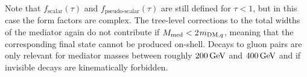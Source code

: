 Note that $ f_{\text{scalar}} (\tau)$ and $ f_{\text{pseudo-scalar}} (\tau)$ are still defined for $\tau < 1$, but in this case the form factors are complex. The tree-level corrections to the total widths of the mediator again do not contribute if $M_{\rm{med}} < 2 \hspace{0.25mm}  m_{{\rm{DM}}, q}$, meaning that the corresponding final state cannot be produced on-shell.  Decays to gluon pairs are only relevant for mediator masses between roughly $200 \, {\rm GeV}$ and $400 \,{\rm GeV}$ and if invisible decays are kinematically forbidden.
	
\begin{comment}


Comparing or combining searches for dark matter (or any collider physics result) requires that we assume a model, whether we are comparing searches in one channel to searches in other channels, at other collision energies, or at other collider experiments. This document adopts the model choices made for early Run-2 LHC searches by the ATLAS/CMS Dark Matter Forum (REF), summarized below. These models assume that the DM particle is a Dirac fermion~$\chi$ and that the particle mediating the interaction (the `mediator') is exchanged in the $s$-channel. Each model is characterised by four parameters: the dark matter matter mass,~$\mDM$, the mediator mass,~$\mmed$, the mediator coupling to quarks,~$\gq$, and the mediator coupling to DM,~$\gDM$. In this section we define the models through the interaction Lagrangians and give the formulae for the mediator width. In the next section we provide recommendations for specific values of the parameters.

\subsection{Vector and axial-vector $s$-channel models}

The two models with a vector or axial-vector mediator, $Z'$, have the following interaction Lagrangians
\begin{align}
\label{eq:AV1} 
\mathcal{L}_{\mathrm{vector}}&=- \gDM Z'_{\mu} \bar{\chi}\gamma^{\mu}\chi -\sum_{q=u,d,s,c,b,t} \gq Z'_{\mu} \bar{q}\gamma^{\mu}q \\
\label{eq:AV1} 
\mathcal{L}_{\rm{axial-vector}}&=- \gDM Z'_{\mu} \bar{\chi}\gamma^{\mu}\gamma^5\chi -\sum_{q=u,d,s,c,b,t} \gq Z'_{\mu} \bar{q}\gamma^{\mu}\gamma^5q\;.
\end{align}
\textbf{FK: To avoid any misunderstanding, should we maybe write $\gq$ in front of the sum, to make it clear that this is just one parameter for all quarks?}


\end{comment}
